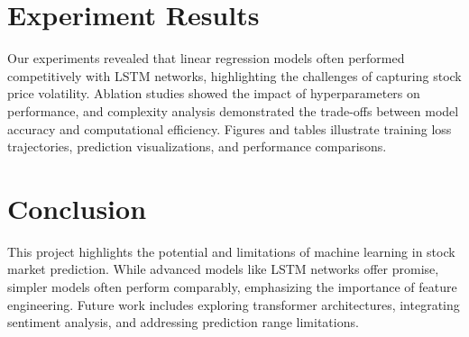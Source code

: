 \documentclass[sigconf]{acmart}
\begin{document}
\section{Experiment Results}
Our experiments revealed that linear regression models often performed competitively with LSTM networks, highlighting the challenges of capturing stock price volatility. Ablation studies showed the impact of hyperparameters on performance, and complexity analysis demonstrated the trade-offs between model accuracy and computational efficiency. Figures and tables illustrate training loss trajectories, prediction visualizations, and performance comparisons.

\section{Conclusion}
This project highlights the potential and limitations of machine learning in stock market prediction. While advanced models like LSTM networks offer promise, simpler models often perform comparably, emphasizing the importance of feature engineering. Future work includes exploring transformer architectures, integrating sentiment analysis, and addressing prediction range limitations.



\end{document}
